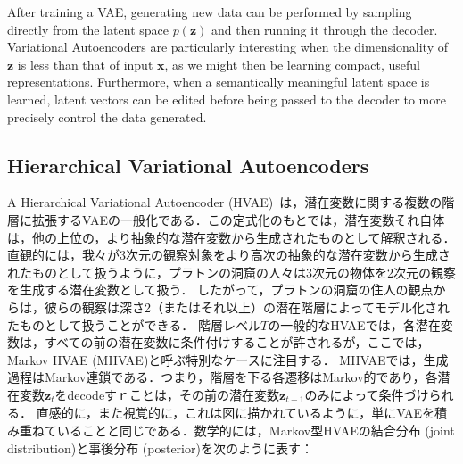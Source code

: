 After training a VAE, generating new data can be performed by sampling directly from the latent space $p(\bm{z})$ and then running it through the decoder.  Variational Autoencoders are particularly interesting when the dimensionality of $\bm{z}$ is less than that of input $\bm{x}$, as we might then be learning compact, useful representations.  Furthermore, when a semantically meaningful latent space is learned, latent vectors can be edited before being passed to the decoder to more precisely control the data generated.

\subsection{Hierarchical Variational Autoencoders}
%

A Hierarchical Variational Autoencoder (HVAE)~\cite{kingma2016improved, sonderby2016ladder}は，潜在変数に関する複数の階層に拡張するVAEの一般化である．この定式化のもとでは，潜在変数それ自体は，他の上位の，より抽象的な潜在変数から生成されたものとして解釈される．直観的には，我々が3次元の観察対象をより高次の抽象的な潜在変数から生成されたものとして扱うように，プラトンの洞窟の人々は3次元の物体を2次元の観察を生成する潜在変数として扱う． したがって，プラトンの洞窟の住人の観点からは，彼らの観察は深さ2（またはそれ以上）の潜在階層によってモデル化されたものとして扱うことができる． 階層レベル$T$の一般的なHVAEでは，各潜在変数は，すべての前の潜在変数に条件付けすることが許されるが，ここでは，Markov HVAE (MHVAE)と呼ぶ特別なケースに注目する． MHVAEでは，生成過程はMarkov連鎖である．つまり，階層を下る各遷移はMarkov的であり，各潜在変数$\bm{z}_t$をdecodeすｒことは，その前の潜在変数$\bm{z}_{t+1}$のみによって条件づけられる． 直感的に，また視覚的に，これは図に描かれているように，単にVAEを積み重ねていることと同じである．数学的には，Markov型HVAEの結合分布 (joint distribution)と事後分布 (posterior)を次のように表す：

